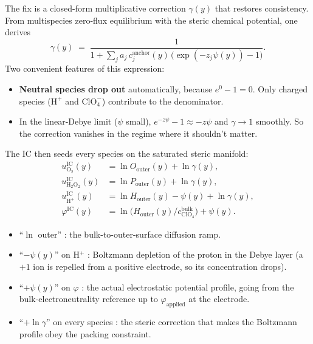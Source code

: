 \documentclass[11pt]{article}
\begin{document}
The fix is a closed-form multiplicative correction $\gamma(y)$ that
restores consistency. From multispecies zero-flux equilibrium with
the steric chemical potential, one derives
\begin{equation}
  \boxed{\;
  \gamma(y) \;=\;
     \frac{1}{1 + \sum_j a_j\,c_j^{\mathrm{anchor}}(y)\,
                    \bigl(\exp(-z_j \psi(y)) - 1\bigr)}.
  \;}
\end{equation}
Two convenient features of this expression:
\begin{itemize}
\item \textbf{Neutral species drop out} automatically, because
      $e^{0} - 1 = 0$. Only charged species ($\mathrm{H^+}$ and
      $\mathrm{ClO_4^-}$) contribute to the denominator.
\item In the linear-Debye limit ($\psi$ small), $e^{-z\psi} - 1
      \approx -z \psi$ and $\gamma \to 1$ smoothly. So the correction
      vanishes in the regime where it shouldn't matter.
\end{itemize}

The IC then seeds every species on the saturated steric manifold:
\begin{align}
  u_{\mathrm{O_2}}^{\mathrm{IC}}(y)    &= \ln O_{\mathrm{outer}}(y)  + \ln \gamma(y), \\
  u_{\mathrm{H_2O_2}}^{\mathrm{IC}}(y) &= \ln P_{\mathrm{outer}}(y)  + \ln \gamma(y), \\
  u_{\mathrm{H^+}}^{\mathrm{IC}}(y)    &= \ln H_{\mathrm{outer}}(y) - \psi(y) + \ln \gamma(y),\\
  \varphi^{\mathrm{IC}}(y)             &= \ln\!\bigl(H_{\mathrm{outer}}(y) / c_{\mathrm{ClO_4}}^{\mathrm{bulk}}\bigr) + \psi(y).
\end{align}

\begin{tcolorbox}[notebox, title={What the pieces are doing, in plain English}]
\begin{itemize}
\item ``$\ln$ outer'' : the bulk-to-outer-surface diffusion ramp.
\item ``$-\psi(y)$'' on H$^+$ : Boltzmann depletion of the proton in
      the Debye layer (a $+1$ ion is repelled from a positive
      electrode, so its concentration drops).
\item ``$+\psi(y)$'' on $\varphi$ : the actual electrostatic
      potential profile, going from the bulk-electroneutrality
      reference up to $\varphi_{\mathrm{applied}}$ at the electrode.
\item ``$+\ln\gamma$'' on every species : the steric correction
      that makes the Boltzmann profile obey the packing constraint.
\end{itemize}
\end{tcolorbox}
\end{document}
